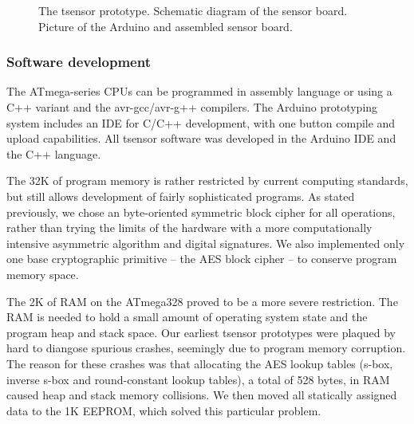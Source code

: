 \begin{figure}[!t]
\centerline{
} 
\caption{The tsensor prototype. 
 Schematic diagram of the sensor board. 
 Picture of the Arduino and assembled sensor board.}
\label{fig:tsensor}
\end{figure}

\subsubsection{Software development} 

The ATmega-series CPUs can be programmed in assembly language or using a C++ variant and the avr-gcc/avr-g++ compilers. The Arduino prototyping system includes an IDE for C/C++ development, with one button compile and upload capabilities. All tsensor software was developed in the Arduino IDE and the C++ language.

The 32K of program memory is rather restricted by current computing standards, but still allows development of fairly sophisticated programs. As stated previously, we chose an byte-oriented symmetric block cipher for all operations, rather than trying the limits of the hardware with a more computationally intensive asymmetric algorithm and digital signatures. We also implemented only one base cryptographic primitive -- the AES block cipher -- to conserve program memory space.

The 2K of RAM on the ATmega328 proved to be a more severe restriction. The RAM is needed to hold a small amount of operating system state and the program heap and stack space. Our earliest tsensor prototypes were plaqued by hard to diangose spurious crashes, seemingly due to program memory corruption. The reason for these crashes was that allocating the AES lookup tables (s-box, inverse s-box and round-constant lookup tables), a total of 528 bytes, in RAM caused heap and stack memory collisions. We then moved all statically assigned data to the 1K EEPROM, which solved this particular problem.

